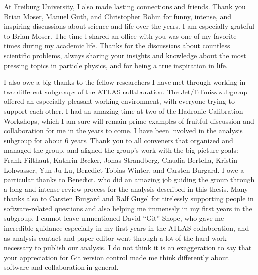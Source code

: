 At Freiburg University, I also made lasting connections and friends. Thank you Brian Moser, Manuel Guth, and Christopher Böhm for funny, intense, and inspiring discussions about science and life over the years.
I am especially grateful to Brian Moser. The time I shared an office with you was one of my favorite times during my academic life. Thanks for the discussions about countless scientific problems, always sharing your insights and knowledge about the most pressing topics in particle physics, and for being a true inspiration in life.

I also owe a big thanks to the fellow researchers I have met through working in two different subgroups of the ATLAS collaboration. 
The Jet/ETmiss subgroup offered an especially pleasant working environment, with everyone trying to support each other. I had an amazing time at two of the Hadronic Calibration Workshops, which I am sure will remain prime examples of fruitful discussion and collaboration for me in the years to come. 
I have been involved in the \HWW analysis subgroup for about 6 years.
Thank you to all conveners that organized and managed the group, and aligned the group's work with the big picture goals: Frank Filthaut, Kathrin Becker, Jonas Strandberg, Claudia Bertella, Kristin Lohwasser, Yun-Ju Lu, Benedict Tobias Winter, and Carsten Burgard. 
I owe a particular thanks to Benedict, who did an amazing job guiding the group through a long and intense review process for the analysis described in this thesis. 
Many thanks also to Carsten Burgard and Ralf Gugel for tirelessly supporting people in software-related questions and also helping me immensely in my first years in the \HWW subgroup. 
I cannot leave unmentioned David ``Git'' Shope, who gave me incredible guidance especially in my first years in the ATLAS collaboration, and as analysis contact and paper editor went through a lot of the hard work necessary to publish our analysis. I do not think it is an exaggeration to say that your appreciation for Git version control made me think differently about software and collaboration in general. 

